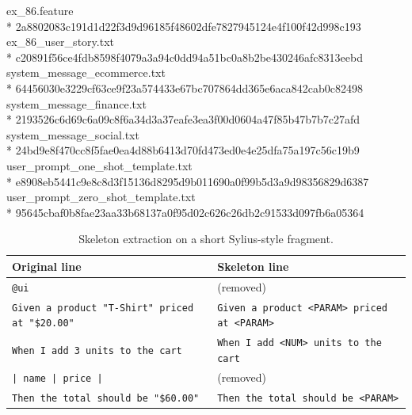 {ex\_86.feature\\*
\hspace*{2ex}2a8802083c191d1d22f3d9d96185f48602dfe7827945124e4f100f42d998c193\\[3pt]
ex\_86\_user\_story.txt\\*
\hspace*{2ex}c20891f56ce4fdb8598f4079a3a94c0dd94a51bc0a8b2be430246afc8313eebd\\[3pt]
system\_message\_ecommerce.txt\\*
\hspace*{2ex}64456030e3229cf63ce9f23a574433e67bc707864dd365e6aca842cab0c82498\\[3pt]
system\_message\_finance.txt\\*
\hspace*{2ex}2193526c6d69c6a09c8f6a34d3a37eafe3ea3f00d0604a47f85b47b7b7c27afd\\[3pt]
system\_message\_social.txt\\*
\hspace*{2ex}24bd9e8f470cc8f5fae0ea4d88b6413d70fd473ed0e4e25dfa75a197c56c19b9\\[3pt]
user\_prompt\_one\_shot\_template.txt\\*
\hspace*{2ex}e8908eb5441c9e8c8d3f15136d8295d9b011690a0f99b5d3a9d98356829d6387\\[3pt]
user\_prompt\_zero\_shot\_template.txt\\*
\hspace*{2ex}95645cbaf0b8fae23aa33b68137a0f95d02c626c26db2c91533d097fb6a05364\par
}
\medskip

\begin{table}[H]
\centering
\caption{Skeleton extraction on a short Sylius-style fragment.}
\label{tab:skeleton}
\begin{tabular}{@{}>{\raggedright\arraybackslash}p{5.8cm}>{\raggedright\arraybackslash}p{5.8cm}@{}}
\hline
Original line & Skeleton line\\
\hline
\texttt{@ui} & (removed)\\
\texttt{Given a product "T-Shirt" priced at "\$20.00"} & \texttt{Given a product <PARAM> priced at <PARAM>}\\
\texttt{When I add 3 units to the cart} & \texttt{When I add <NUM> units to the cart}\\
\texttt{| name | price |} & (removed)\\
\texttt{Then the total should be "\$60.00"} & \texttt{Then the total should be <PARAM>}\\
\hline
\end{tabular}
\end{table}


